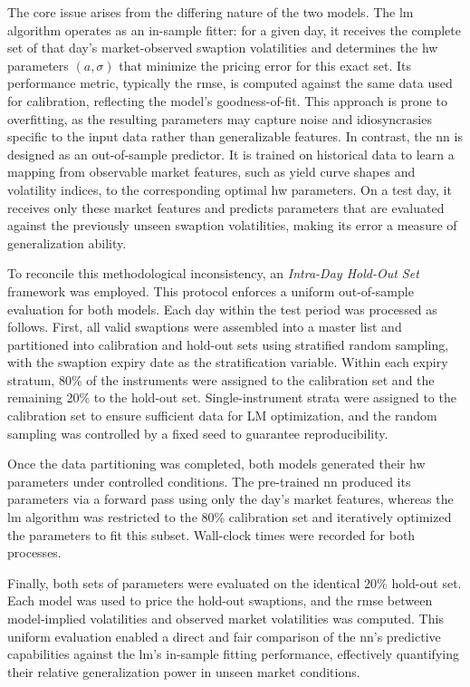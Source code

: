 The core issue arises from the differing nature of the two models. The \ac{lm} algorithm operates as an in-sample fitter: for a given day, it receives the complete set of that day's market-observed swaption volatilities and determines the \ac{hw} parameters $(a, \sigma)$ that minimize the pricing error for this exact set. Its performance metric, typically the \ac{rmse}, is computed against the same data used for calibration, reflecting the model's goodness-of-fit. This approach is prone to overfitting, as the resulting parameters may capture noise and idiosyncrasies specific to the input data rather than generalizable features. In contrast, the \ac{nn} is designed as an out-of-sample predictor. It is trained on historical data to learn a mapping from observable market features, such as yield curve shapes and volatility indices, to the corresponding optimal \ac{hw} parameters. On a test day, it receives only these market features and predicts parameters that are evaluated against the previously unseen swaption volatilities, making its error a measure of generalization ability.

To reconcile this methodological inconsistency, an \emph{Intra-Day Hold-Out Set} framework was employed. This protocol enforces a uniform out-of-sample evaluation for both models. Each day within the test period was processed as follows. First, all valid swaptions were assembled into a master list and partitioned into calibration and hold-out sets using stratified random sampling, with the swaption expiry date as the stratification variable. Within each expiry stratum, 80\% of the instruments were assigned to the calibration set and the remaining 20\% to the hold-out set. Single-instrument strata were assigned to the calibration set to ensure sufficient data for LM optimization, and the random sampling was controlled by a fixed seed to guarantee reproducibility.

Once the data partitioning was completed, both models generated their \ac{hw} parameters under controlled conditions. The pre-trained \ac{nn} produced its parameters via a forward pass using only the day's market features, whereas the \ac{lm} algorithm was restricted to the 80\% calibration set and iteratively optimized the parameters to fit this subset. Wall-clock times were recorded for both processes.

Finally, both sets of parameters were evaluated on the identical 20\% hold-out set. Each model was used to price the hold-out swaptions, and the \ac{rmse} between model-implied volatilities and observed market volatilities was computed. This uniform evaluation enabled a direct and fair comparison of the \ac{nn}'s predictive capabilities against the \ac{lm}'s in-sample fitting performance, effectively quantifying their relative generalization power in unseen market conditions.

